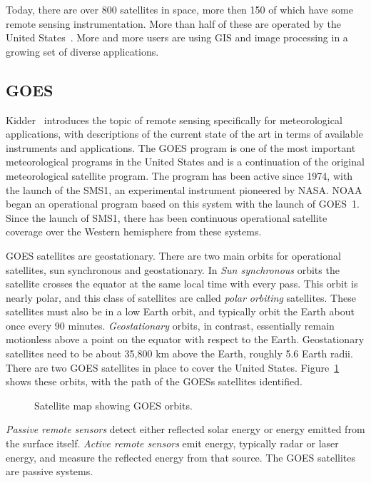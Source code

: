 \documentclass{ucdthesis}       %
\begin{document}
Today, there are over 800 satellites in space, more then 150 of which
have some remote sensing instrumentation.  More than half of these are
operated by the United States~\cite{concerned06ucs-satel-datab}.  More
and more users are using \ac{GIS} and image processing in a growing
set of diverse applications.


\subsection{\acf{GOES}}
\label{sec:rsi}

Kidder~\cite{kidder95satel-meteor} introduces the topic of remote
sensing specifically for meteorological applications, with
descriptions of the current state of the art in terms of available
instruments and applications.  The \ac{GOES} program is one of the
most important meteorological programs in the United States and is a
continuation of the original meteorological satellite program.  The
program has been active since 1974, with the launch of the \ac{SMS1},
an experimental instrument pioneered by \acs{NASA}.  \acf{NOAA} began
an operational program based on this system with the launch of
\ac{GOES}~1.  Since the launch of \ac{SMS1}, there has been continuous
operational satellite coverage over the Western hemisphere from these
systems.

\ac{GOES} satellites are geostationary.  There are two main orbits for
operational satellites, sun synchronous and geostationary.  In
\emph{Sun synchronous} orbits the satellite crosses the equator at the
same local time with every pass.  This orbit is nearly polar, and this
class of satellites are called \emph{polar orbiting} satellites.
These satellites must also be in a low Earth orbit, and typically
orbit the Earth about once every 90 minutes.  \emph{Geostationary}
orbits, in contrast, essentially remain motionless above a point on
the equator with respect to the Earth.  Geostationary satellites need
to be about 35,800 km above the Earth, roughly 5.6 Earth radii.  There
are two \ac{GOES} satellites in place to cover the United States.
Figure~\ref{fig:sats} shows these orbits, with the path of the
\acp{GOES} satellites identified.

\begin{figure}[htb]
  \centering
  
  \caption{Satellite map showing \acs{GOES} orbits.}
  \label{fig:sats}
\end{figure}

\emph{Passive remote sensors} detect either reflected solar energy or
energy emitted from the surface itself.  \emph{Active remote sensors}
emit energy, typically radar or laser energy, and measure the
reflected energy from that source.  The \ac{GOES} satellites are
passive systems.
\end{document}
